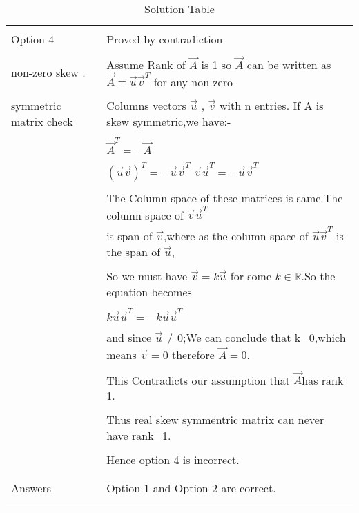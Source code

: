\begin{longtable}{|l|l|}
    \hline
	\multirow{3}{*}{Option 4}
	&\\
	&Proved by contradiction\\
	&\\
    non-zero skew .&Assume Rank of $\vec{A}$ is 1 so $\vec{A}$ can be written as $\vec{A}=\vec{u}\vec{v}^T$ for any non-zero\\
    &\\
    symmetric matrix check&Columns vectors $\vec{u}$ , $\vec{v}$ with n entries. If A is skew symmetric,we have:-\\
    &\\
    &$\vec{A}^T=-\vec{A}$\\
    &\\
    &$(\vec{u}\vec{v})^T=-\vec{u}\vec{v}^T$ $\vec{v}\vec{u}^T=-\vec{u}\vec{v}^T$\\
    &\\
    &The Column space of these matrices is same.The column space of $\vec{v}\vec{u}^T$\\ 
    &is span of $\vec{v}$,where as the column space of $\vec{u}\vec{v}^T$ is the span of $\vec{u}$,\\
    &\\
    &So we must have $\vec{v}=k\vec{u}$ for some $k\in\mathbb{R}$.So the equation becomes\\
    &\\
    &$k\vec{u}\vec{u}^T=-k\vec{u}\vec{u}^T$ \\
    &\\
    &and since $\vec{u}\neq 0$;We can conclude that k=0,which means $\vec{v}=0$ therefore $\vec{A}=0$.\\
    &\\
    &This Contradicts our assumption that $\vec{A}$has rank 1.\\
    &\\
    &Thus real skew symmentric matrix can never have rank=1.\\
    &\\
    &Hence option 4 is incorrect.\\
    &\\
	\hline
	\multirow{3}{*}{Answers}
	&\\
&Option 1 and Option 2 are correct.\\
&\\
	\hline
	
	\caption{Solution Table}
    \label{eq:solutions/2015/june/71/table:2}
\end{longtable}
\twocolumn

